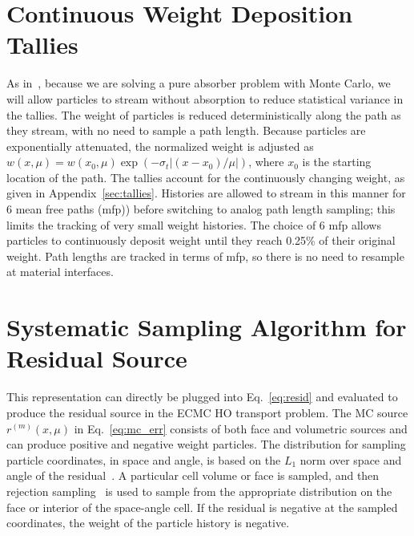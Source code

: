 \section{Continuous Weight Deposition Tallies}


As in~\cite{park}, because we are solving a pure absorber problem with Monte Carlo, we will allow
particles to stream without absorption to reduce statistical 
variance in the tallies.  The weight of particles is reduced deterministically along
the path as they stream, with no need to sample a path length.  Because particles are exponentially attenuated, the normalized weight is
adjusted as $w(x,\mu) = w(x_0,\mu)\exp(-\sigma_t|(x-x_0)/\mu|)$, where $x_0$ is the starting location of the path.  The tallies account
for the continuously changing weight, as given in Appendix~\ref{sec:tallies}. Histories are allowed to stream in this manner for 6 mean free paths (mfp))
before switching to analog path length sampling; this limits the tracking of very small weight histories. The choice of 6 mfp allows particles to 
continuously deposit weight until they reach 0.25\% of their original weight.  Path lengths are tracked in terms of mfp, so there is no need to resample at material
interfaces.

\section{Systematic Sampling Algorithm for Residual Source}
\label{sec:systematic_sampling}

This representation can directly be plugged into
Eq.~\eqref{eq:resid} and evaluated to produce the residual source in the ECMC HO transport
problem.  The MC source $r^{(m)}(x,\mu)$ in Eq.~\eqref{eq:mc_err}
consists of both face and volumetric sources and can produce positive and
negative weight particles.  The distribution for sampling particle coordinates, in space and angle, is based on the $L_1$
norm over space and angle of the residual~\cite{jake}.  A particular cell volume or face 
is sampled, and then rejection sampling~\cite{shultis_mc} is used to sample from
the appropriate distribution on the face or interior of the space-angle cell.  If the
residual is negative at the sampled coordinates, the weight of the particle history is negative.

